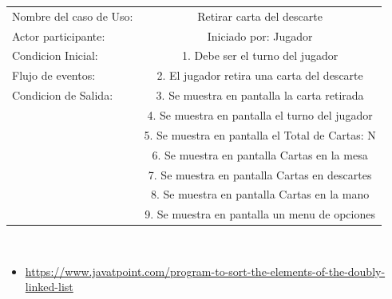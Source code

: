 \documentclass[60pt]{article}
\begin{document}
\begin{center}
    \begin{tabular}{ l | c  }
        
        Nombre del caso de Uso: & Retirar carta del descarte \\
        Actor participante: & Iniciado por: Jugador \\\hline
        Condicion Inicial: & 1. Debe ser el turno del jugador    \\
        Flujo de eventos: & 2. El jugador retira una carta del descarte \\\hline
        Condicion de Salida: & 3. Se muestra en pantalla la carta retirada \\
        & 4. Se muestra en pantalla el turno del jugador \\
        & 5. Se muestra en pantalla el Total de Cartas: N \\
        & 6. Se muestra en pantalla Cartas en la mesa \\
        & 7. Se muestra en pantalla Cartas en descartes \\
        & 8. Se muestra en pantalla Cartas en la mano \\
        & 9. Se muestra en pantalla un menu de opciones \\ 
    \end{tabular} \\
\end{center}


\begin{itemize}
    \item \url{https://www.javatpoint.com/program-to-sort-the-elements-of-the-doubly-linked-list}
\end{itemize} 


% 
% 



\end{document}

